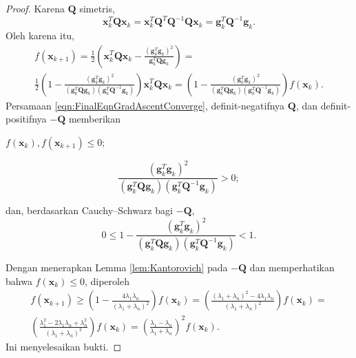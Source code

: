 \begin{proof}
Karena $\mathbf{Q}$ simetris,
\begin{equation}
\mathbf{x}_k^T\mathbf{Q}\mathbf{x}_k
=\mathbf{x}_k^T\mathbf{Q}^T\mathbf{Q}^{-1}\mathbf{Q}\mathbf{x}_k
=\mathbf{g}_k^T\mathbf{Q}^{-1}\mathbf{g}_k.
\end{equation}
Oleh karena itu,
\begin{multline}
f(\mathbf{x}_{k+1})=
\frac{1}{2}\left(
\mathbf{x}_k^T\mathbf{Q}\mathbf{x}_k
-\frac{(\mathbf{g}_k^T\mathbf{g}_k)^2}{\mathbf{g}_k^T\mathbf{Q}\mathbf{g}_k}
\right)=\\
\frac{1}{2}\left(
1-\frac{(\mathbf{g}_k^T\mathbf{g}_k)^2}
{(\mathbf{g}_k^T\mathbf{Q}\mathbf{g}_k)
(\mathbf{g}_k^T\mathbf{Q}^{-1}\mathbf{g}_k)}
\right)\mathbf{x}_k^T\mathbf{Q}\mathbf{x}_k
=\left(
1-\frac{(\mathbf{g}_k^T\mathbf{g}_k)^2}
{(\mathbf{g}_k^T\mathbf{Q}\mathbf{g}_k)
(\mathbf{g}_k^T\mathbf{Q}^{-1}\mathbf{g}_k)}
\right)f(\mathbf{x}_k).
\label{eqn:FinalEqnGradAscentConverge}
\end{multline}
Persamaan \ref{eqn:FinalEqnGradAscentConverge}, definit-negatifnya $\mathbf{Q}$, dan definit-positifnya $-\mathbf{Q}$ memberikan
\begin{enumerate*}
\item $f(\mathbf{x}_k),f(\mathbf{x}_{k+1})\leq0$;
\item
\begin{displaymath}
\frac{(\mathbf{g}_k^T\mathbf{g}_k)^2}
{(\mathbf{g}_k^T\mathbf{Q}\mathbf{g}_k)
(\mathbf{g}_k^T\mathbf{Q}^{-1}\mathbf{g}_k)}>0;
\end{displaymath}
\item dan, berdasarkan Cauchy--Schwarz bagi $-\mathbf{Q}$,
\begin{displaymath}
0\leq
1-\frac{(\mathbf{g}_k^T\mathbf{g}_k)^2}
{(\mathbf{g}_k^T\mathbf{Q}\mathbf{g}_k)
(\mathbf{g}_k^T\mathbf{Q}^{-1}\mathbf{g}_k)}<1.
\end{displaymath}
\end{enumerate*}
Dengan menerapkan Lemma \ref{lem:Kantorovich} pada $-\mathbf{Q}$ dan memperhatikan bahwa $f(\mathbf{x}_k)\leq0$, diperoleh
\begin{multline}
f(\mathbf{x}_{k+1})\geq
\left(1-\frac{4\lambda_1\lambda_n}{(\lambda_1+\lambda_n)^2}\right)f(\mathbf{x}_k)
=\left(
\frac{(\lambda_1+\lambda_n)^2-4\lambda_1\lambda_n}
{(\lambda_1+\lambda_n)^2}
\right)f(\mathbf{x}_k)=\\
\left(
\frac{\lambda_1^2-2\lambda_1\lambda_n+\lambda_n^2}
{(\lambda_1+\lambda_n)^2}
\right)f(\mathbf{x}_k)
=\left(\frac{\lambda_1-\lambda_n}{\lambda_1+\lambda_n}\right)^2
f(\mathbf{x}_k).
\end{multline}
Ini menyelesaikan bukti.
\end{proof}

